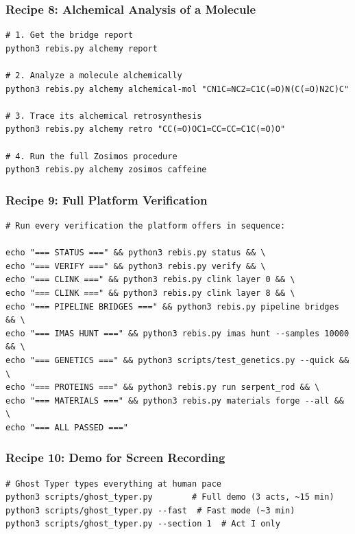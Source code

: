 \documentclass[12pt,a4paper]{article}
\begin{document}
\hypertarget{recipe-8-alchemical-analysis-of-a-molecule}{%
\subsubsection{Recipe 8: Alchemical Analysis of a
Molecule}\label{recipe-8-alchemical-analysis-of-a-molecule}}

\begin{verbatim}
# 1. Get the bridge report
python3 rebis.py alchemy report

# 2. Analyze a molecule alchemically
python3 rebis.py alchemy alchemical-mol "CN1C=NC2=C1C(=O)N(C(=O)N2C)C"

# 3. Trace its alchemical retrosynthesis
python3 rebis.py alchemy retro "CC(=O)OC1=CC=CC=C1C(=O)O"

# 4. Run the full Zosimos procedure
python3 rebis.py alchemy zosimos caffeine
\end{verbatim}

\hypertarget{recipe-9-full-platform-verification}{%
\subsubsection{Recipe 9: Full Platform
Verification}\label{recipe-9-full-platform-verification}}

\begin{verbatim}
# Run every verification the platform offers in sequence:

echo "=== STATUS ===" && python3 rebis.py status && \
echo "=== VERIFY ===" && python3 rebis.py verify && \
echo "=== CLINK ===" && python3 rebis.py clink layer 0 && \
echo "=== CLINK ===" && python3 rebis.py clink layer 8 && \
echo "=== PIPELINE BRIDGES ===" && python3 rebis.py pipeline bridges && \
echo "=== IMAS HUNT ===" && python3 rebis.py imas hunt --samples 10000 && \
echo "=== GENETICS ===" && python3 scripts/test_genetics.py --quick && \
echo "=== PROTEINS ===" && python3 rebis.py run serpent_rod && \
echo "=== MATERIALS ===" && python3 rebis.py materials forge --all && \
echo "=== ALL PASSED ==="
\end{verbatim}

\hypertarget{recipe-10-demo-for-screen-recording}{%
\subsubsection{Recipe 10: Demo for Screen
Recording}\label{recipe-10-demo-for-screen-recording}}

\begin{verbatim}
# Ghost Typer types everything at human pace
python3 scripts/ghost_typer.py        # Full demo (3 acts, ~15 min)
python3 scripts/ghost_typer.py --fast  # Fast mode (~3 min)
python3 scripts/ghost_typer.py --section 1  # Act I only
\end{verbatim}
\end{document}
